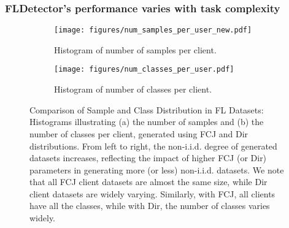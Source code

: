 \subsubsection{FLDetector's performance varies with task complexity}\label{impact:datasets:fld}
\begin{figure}[t]
    \centering
    \begin{subfigure}[b]{1.06\linewidth}
        \hspace{-.6cm}
        \texttt{[image: figures/num\_samples\_per\_user\_new.pdf]}
        \caption{Histogram of number of samples per client.}
        \label{fig:num_samples_per_user}
    \end{subfigure}
    \begin{subfigure}[b]{1.06\linewidth}
        \hspace{-.6cm}
        \texttt{[image: figures/num\_classes\_per\_user.pdf]}
        \caption{Histogram of number of classes per client.}
        \label{fig:num_classes_per_user}
    \end{subfigure}
    \caption{Comparison of Sample and Class Distribution in FL Datasets: Histograms illustrating (a) the number of samples and (b) the number of classes per client, generated using FCJ and Dir distributions. 
    From left to right, the non-i.i.d. degree of generated datasets increases, reflecting the impact of higher FCJ (or Dir) parameters in generating more (or less) non-i.i.d. datasets. We note that all FCJ client datasets are almost the same size, while Dir client datasets are widely varying. Similarly, with FCJ, all clients have all the classes, while with Dir, the number of classes varies widely.}
    \label{fig:num_samples_classes_per_user}
\end{figure}

